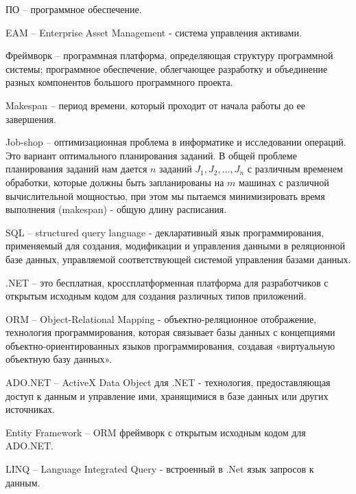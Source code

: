 
ПО -- программное обеспечение.

EAM -- Enterprise Asset Management - система управления активами.

Фреймворк -- программная платформа, определяющая структуру программной системы; программное обеспечение, облегчающее разработку и объединение разных компонентов большого программного проекта.

Makespan -- период времени, который проходит от начала работы до ее завершения.

Job-shop -- оптимизационная проблема в информатике и исследовании операций. Это вариант оптимального планирования заданий. В общей проблеме планирования заданий нам дается $n$ заданий $J_{1}, J_{2}, ..., J_{n}$ с различным временем обработки, которые должны быть запланированы на $m$ машинах с различной вычислительной мощностью, при этом мы пытаемся минимизировать время выполнения (makespan) - общую длину расписания.

SQL -- structured query language - декларативный язык программирования, применяемый для создания, модификации и управления данными в реляционной базе данных, управляемой соответствующей системой управления базами данных.

.NET -- это бесплатная, кроссплатформенная платформа для разработчиков с открытым исходным кодом для создания различных типов приложений.

ORM -- Object-Relational Mapping - объектно-реляционное отображение, технология программирования, которая связывает базы данных с концепциями объектно-ориентированных языков программирования, создавая «виртуальную объектную базу данных».

ADO.NET -- ActiveX Data Object для .NET - технология, предоставляющая доступ к данным и управление ими, хранящимися в базе данных или других источниках.

Entity Framework -- ORM фреймворк с открытым исходным кодом для ADO.NET.

LINQ -- Language Integrated Query - встроенный в .Net язык запросов к данным.
\clearpage
